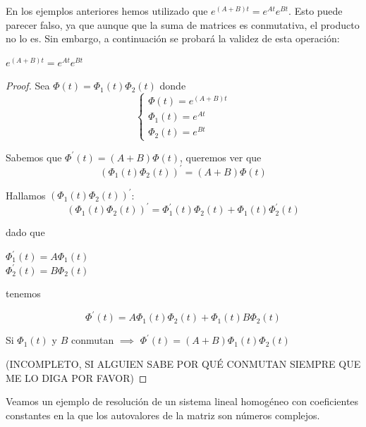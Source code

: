 \documentclass{mathnotes}
\begin{document}
En los ejemplos anteriores hemos utilizado que $e^{(A+B)t} = e^{At}e^{Bt}$. Esto puede parecer falso, ya que aunque que la suma de matrices es conmutativa, el producto no lo es. Sin embargo, a continuación se probará la validez de esta operación:

\begin{theorem}
$e^{(A+B)t} = e^{At}e^{Bt}$
\end{theorem}
\begin{proof}
Sea $\Phi(t) = \Phi_1(t)\Phi_2(t)$ donde 
\begin{equation*}
  \left\lbrace
  \begin{array}{l}
  	\Phi(t) = e^{(A+B)t}\\
	\Phi_1(t) = e^{At}\\
	\Phi_2(t) = e^{Bt}
  \end{array}
  \right.
\end{equation*}

Sabemos que $\Phi^\prime(t) = (A+B)\Phi(t)$, queremos ver que $$(\Phi_1(t)\Phi_2(t))^\prime = (A+B)\Phi(t)$$

Hallamos $(\Phi_1(t)\Phi_2(t))^\prime$:
$$(\Phi_1(t)\Phi_2(t))^\prime = \Phi^\prime_1(t)\Phi_2(t)+\Phi_1(t)\Phi^\prime_2(t)$$

dado que \begin{center}
$\Phi^\prime_1(t) = A\Phi_1(t)$\\
$\Phi^\prime_2(t) = B\Phi_2(t)$
\end{center}

tenemos

$$\Phi^\prime(t) = A\Phi_1(t)\Phi_2(t)+\Phi_1(t)B\Phi_2(t)$$

Si $\Phi_1(t)$ y $B$ conmutan $\implies$ $\Phi^\prime(t) = (A+B)\Phi_1(t)\Phi_2(t)$

(INCOMPLETO, SI ALGUIEN SABE POR QUÉ CONMUTAN SIEMPRE QUE ME LO DIGA POR FAVOR)
\end{proof}

Veamos un ejemplo de resolución de un sistema lineal homogéneo con coeficientes constantes en la que los autovalores de la matriz son números complejos.
\end{document}
